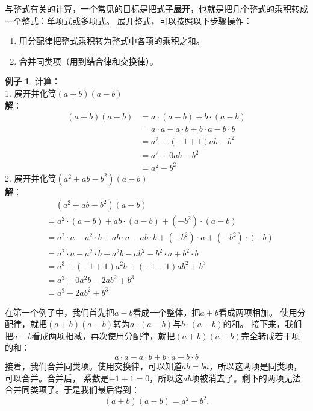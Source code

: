 \documentclass[12pt,UTF8]{ctexbook}
\theoremstyle{definition}
\newtheorem{ex}{例子}[section]
\theoremstyle{plain}
\begin{document}
与整式有关的计算，一个常见的目标是把式子\textbf{展开}，也就是把几个整式的乘积转成一个整式：单项式或多项式。
展开整式，可以按照以下步骤操作：
\begin{enumerate}
    \item 用分配律把整式乘积转为整式中各项的乘积之和。
    \item 合并同类项（用到结合律和交换律）。
\end{enumerate}
\begin{ex}\label{ex:5-0-0}
    计算：\\
    1. 展开并化简$(a + b)(a - b)$\\
    \textbf{解}：
    \begin{align*}
        (a + b)(a - b) &= a\cdot (a - b) + b\cdot (a - b) \tag{分配律展开} \\
        &= a\cdot a - a\cdot b + b\cdot a - b\cdot b \\
        &= a^2 + (-1 + 1)ab - b^2  \tag{合并同类项}\\
        &= a^2 + 0ab - b^2 \\
        &= a^2 - b^2 
    \end{align*}
    2. 展开并化简$(a^2 + ab - b^2)(a - b)$\\
    \textbf{解}：
    \begin{align*}
        &\quad\, (a^2 + ab - b^2)(a - b) \\
        &= a^2\cdot (a - b) + ab\cdot (a - b) + (- b^2)\cdot (a - b) \tag{分配律展开} \\
        &= a^2\cdot a - a^2\cdot b + ab\cdot a - ab\cdot b + (- b^2)\cdot a + (-b^2) \cdot (-b)  \\
        &= a^2\cdot a - a^2\cdot b + a^2b - ab^2 - b^2\cdot a + b^2 \cdot b  \\
        &= a^3 + (-1 + 1)a^2b + (-1 - 1)ab^2 + b^3 \tag{合并同类项}\\
        &= a^3 + 0a^2b - 2ab^2 + b^3 \\
        &= a^3 - 2ab^2 + b^3 
    \end{align*}
\end{ex}

在第一个例子中，我们首先把$a - b$看成一个整体，把$a + b$看成两项相加。
使用分配律，就把$(a + b)(a - b)$转为$a\cdot (a - b)$与$b\cdot (a - b)$的和。
接下来，我们把$a - b$看成两项相减，再次使用分配律，就把$(a + b)(a - b)$完全转成若干项的和：
$$ a\cdot a - a\cdot b + b\cdot a - b\cdot b$$
接着，我们合并同类项。使用交换律，可以知道$ab = ba$，所以这两项是同类项，可以合并。合并后，
系数是$-1 + 1 = 0$，所以这$ab$项被消去了。剩下的两项无法合并同类项了。于是我们最后得到：
$$(a + b)(a - b) = a^2 - b^2. $$
\end{document}
